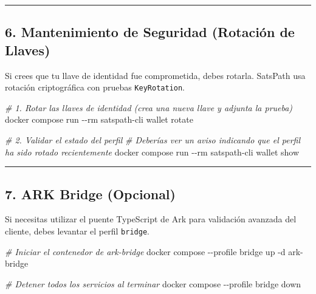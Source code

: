 \documentclass[
]{article}
\newenvironment{Shaded}{}{}
\newcommand{\AttributeTok}[1]{\textcolor[rgb]{0.49,0.56,0.16}{#1}}
\newcommand{\CommentTok}[1]{\textcolor[rgb]{0.38,0.63,0.69}{\textit{#1}}}
\newcommand{\ExtensionTok}[1]{#1}
\newcommand{\NormalTok}[1]{#1}
\begin{document}
\begin{center}\rule{0.5\linewidth}{0.5pt}\end{center}

\hypertarget{mantenimiento-de-seguridad-rotaciuxf3n-de-llaves}{%
\subsection{6. Mantenimiento de Seguridad (Rotación de
Llaves)}\label{mantenimiento-de-seguridad-rotaciuxf3n-de-llaves}}

Si crees que tu llave de identidad fue comprometida, debes rotarla.
SatsPath usa rotación criptográfica con pruebas \texttt{KeyRotation}.

\begin{Shaded}
\begin{Highlighting}[]
\CommentTok{\# 1. Rotar las llaves de identidad (crea una nueva llave y adjunta la prueba)}
\ExtensionTok{docker}\NormalTok{ compose run }\AttributeTok{{-}{-}rm}\NormalTok{ satspath{-}cli wallet rotate}

\CommentTok{\# 2. Validar el estado del perfil}
\CommentTok{\# Deberías ver un aviso indicando que el perfil ha sido rotado recientemente}
\ExtensionTok{docker}\NormalTok{ compose run }\AttributeTok{{-}{-}rm}\NormalTok{ satspath{-}cli wallet show}
\end{Highlighting}
\end{Shaded}

\begin{center}\rule{0.5\linewidth}{0.5pt}\end{center}

\hypertarget{ark-bridge-opcional}{%
\subsection{7. ARK Bridge (Opcional)}\label{ark-bridge-opcional}}

Si necesitas utilizar el puente TypeScript de Ark para validación
avanzada del cliente, debes levantar el perfil \texttt{bridge}.

\begin{Shaded}
\begin{Highlighting}[]
\CommentTok{\# Iniciar el contenedor de ark{-}bridge}
\ExtensionTok{docker}\NormalTok{ compose }\AttributeTok{{-}{-}profile}\NormalTok{ bridge up }\AttributeTok{{-}d}\NormalTok{ ark{-}bridge}

\CommentTok{\# Detener todos los servicios al terminar}
\ExtensionTok{docker}\NormalTok{ compose }\AttributeTok{{-}{-}profile}\NormalTok{ bridge down}
\end{Highlighting}
\end{Shaded}
\end{document}
